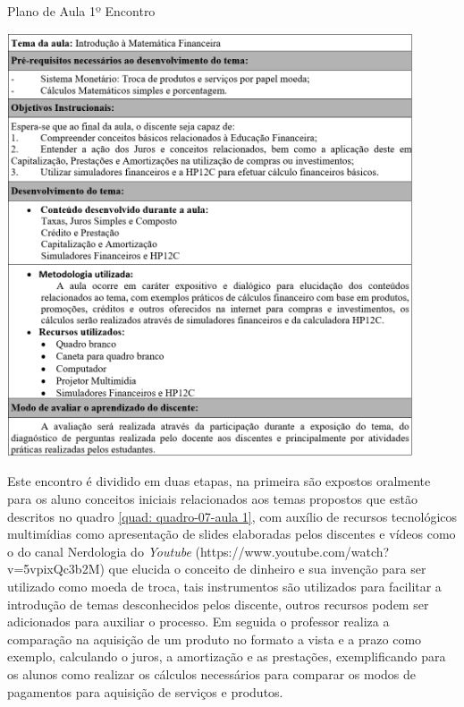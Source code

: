 \graphicspath{{quadros/}}
\begin{quadro}[!ht]
\centering
\begin{minipage}{0.8\textwidth}
\caption{Plano de Aula 1º Encontro}
\centering
\includegraphics[width=0.9\textwidth]{quadro-07-aula 1.png}
\label{quad: quadro-07-aula 1}
\end{minipage}
\end{quadro}

Este encontro é dividido em duas etapas, na primeira são expostos oralmente para os aluno conceitos iniciais relacionados aos temas propostos que estão descritos no quadro \ref{quad: quadro-07-aula 1}, com auxílio de recursos tecnológicos multimídias como apresentação de slides elaboradas pelos discentes e vídeos como o do canal Nerdologia do \textit{Youtube} (https://www.youtube.com/watch?v=5vpixQc3b2M) que elucida o conceito de dinheiro e sua invenção para ser utilizado como moeda de troca, tais instrumentos são utilizados para facilitar a introdução de temas desconhecidos pelos discente, outros recursos podem ser adicionados para auxiliar o processo. Em seguida o professor realiza a comparação na aquisição de um produto no formato a vista e a prazo como exemplo, calculando o juros, a amortização e as prestações, exemplificando para os alunos como realizar os cálculos necessários para comparar os modos de pagamentos para aquisição de serviços e produtos.

